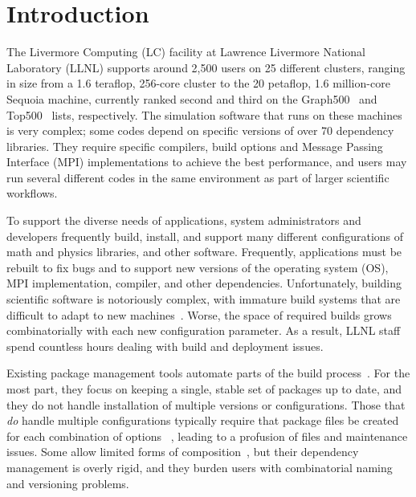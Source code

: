 
\section{Introduction}
\label{sec:intro}

The Livermore Computing (LC) facility at Lawrence Livermore National Laboratory
(LLNL) supports around 2,500 users on 25 different clusters, ranging
in size from a 1.6 teraflop, 256-core cluster to the
20 petaflop, 1.6 million-core Sequoia machine, currently ranked second and
third on the Graph500~\cite{graph500} and Top500~\cite{top500}
lists, respectively.
%
%
The simulation software that runs on these machines is very complex; some
codes depend on specific versions of over 70 dependency libraries.
They require specific compilers, build options and Message Passing Interface (MPI)
implementations to
achieve the best performance, and users may run several
different codes in the same environment as part of larger
scientific workflows.

To support the diverse needs of applications, system administrators
and developers frequently build, install, and support many
different configurations of math and physics libraries, and
other software.  Frequently, applications must be rebuilt to fix bugs
and to support new versions of the operating system (OS), 
MPI implementation, compiler, and other
dependencies.  Unfortunately, building scientific software is
notoriously complex, with immature build systems that are difficult to
adapt to new
machines~\cite{dubois+:comp-sci-eng,hoste+:pyhpc12,wilson+:corr}.
Worse, the space of required builds grows combinatorially with each
new configuration parameter. As a result, LLNL staff spend countless
hours dealing with build and deployment issues.

Existing package management tools automate parts of the build
process~\cite{bsdports,digirolamo:smithy,dolstra+:icfp08,dolstra+:lisa04,hashdist,homebrew,hoste+:pyhpc12,macports,thiruvathukal:gentoo04}.
For the most part, they focus on keeping a single, stable set of
packages up to date, and they do not handle installation of multiple versions or
configurations.  Those that {\it do} handle multiple configurations
typically require that package files be created for each combination of
options~ \cite{digirolamo:smithy,dolstra+:icfp08,dolstra+:lisa04,hoste+:pyhpc12},
leading to a profusion of files and maintenance issues.
Some allow limited forms of 
composition~\cite{hoste+:pyhpc12,dolstra+:icfp08,dolstra+:lisa04}, but their
dependency management is overly rigid, and they burden users with
combinatorial naming and versioning problems.

